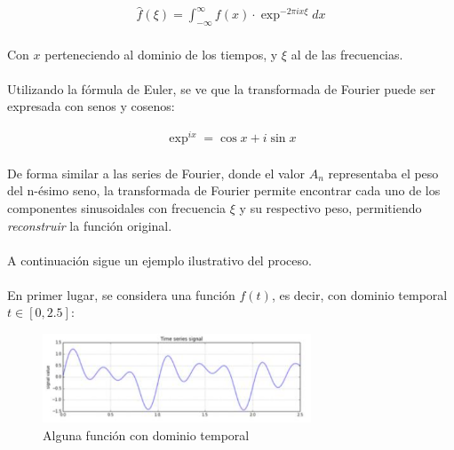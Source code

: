 \documentclass[12pt, twocolumn]{article}
\begin{document}
	\begin{align}
		\hat{f}(\xi) = \int_{-\infty}^{\infty} f(x)\cdot\exp^{-2\pi i x\xi} dx
	\end{align}
	
	\paragraph{} Con $x$ perteneciendo al dominio de los tiempos, y $\xi$ al de las frecuencias.
	
	\paragraph{} Utilizando la fórmula de Euler, se ve que la transformada de Fourier puede ser expresada con senos y cosenos:
	
	\begin{align*}
		\exp^{ix}=\cos x + i \sin x
	\end{align*}
	
	\paragraph{} De forma similar a las series de Fourier, donde el valor $A_{n}$ representaba el peso del n-ésimo seno, la transformada de Fourier permite encontrar cada uno de los componentes sinusoidales con frecuencia $\xi$ y su respectivo peso, permitiendo \textit{reconstruir} la función original.
	
	\paragraph{} A continuación sigue un ejemplo ilustrativo del proceso.
	
	\paragraph{} En primer lugar, se considera una función $f(t)$, es decir, con dominio temporal $t \in \left[0,2.5\right]$:
	
	\begin{figure}[H]
		\centering
		\includegraphics[width=8cm]{ft.png}
		\caption{Alguna función con dominio temporal}
		\label{ft}
	\end{figure}
	
\end{document}
